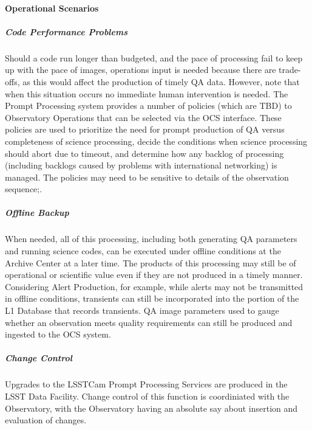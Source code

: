 \paragraph{Operational Scenarios}

\subparagraph{Code Performance Problems}
Should a code run longer than budgeted, and the pace of processing
fail to keep up with the pace of images, operations input is needed
because there are trade-offs, as this would affect the production of
timely QA data.  However, note that when this situation occurs no
immediate human intervention is needed.  The Prompt Processing system
provides a number of policies (which are TBD) to Observatory
Operations that can be selected via the OCS interface.  These policies
are used to prioritize the need for prompt production of QA versus
completeness of science processing, decide the conditions when science
processing should abort due to timeout, and determine how any backlog
of processing (including backlogs caused by problems with
international networking) is managed.  The policies may need to be
sensitive to details of the observation sequence;.

\subparagraph{Offline Backup}
When needed, all of this processing, including both generating QA
parameters and running science codes, can be executed under offline
conditions at the Archive Center at a later time.  The products of
this processing may still be of operational or scientific value even
if they are not produced in a timely manner.  Considering Alert
Production, for example, while alerts may not be transmitted in
offline conditions, transients can still be incorporated into the
portion of the L1 Database that records transients.  QA image
parameters used to gauge whether an observation meets quality
requirements can still be produced and ingested to the OCS system.

\subparagraph{Change Control}
Upgrades to the LSSTCam Prompt Processing Services are produced in the LSST Data Facility. Change control
of this function is coordiniated with the Observatory, with the Observatory having an absolute say
about insertion and evaluation of changes.
